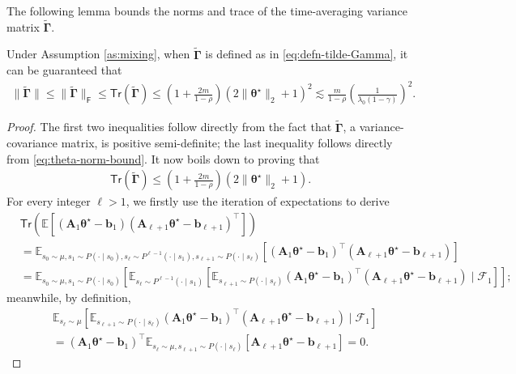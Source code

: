 The following lemma bounds the norms and trace of the time-averaging variance matrix $\tilde{\bm{\Gamma}}$.
\begin{customlemma}\label{lemma:Gamma}
Under Assumption \ref{as:mixing}, when $\tilde{\bm{\Gamma}}$ is defined as in \eqref{eq:defn-tilde-Gamma}, it can be guaranteed that
\begin{align*}
\|\tilde{\bm{\Gamma}}\| \leq \|\tilde{\bm{\Gamma}}\|_{\mathsf{F}} \leq \mathsf{Tr}(\tilde{\bm{\Gamma}}) \leq \left(1+\frac{2m}{1-\rho}\right) (2\|\bm{\theta}^\star\|_2+1)^2 \lesssim \frac{m}{1-\rho}\left(\frac{1}{\lambda_0(1-\gamma)}\right)^2.
\end{align*}
\end{customlemma}
\begin{proof} 
The first two inequalities follow directly from the fact that $\tilde{\bm{\Gamma}}$, a variance-covariance matrix, is positive semi-definite; the last inequality follows directly from \eqref{eq:theta-norm-bound}. It now boils down to proving that
\begin{align*}
\mathsf{Tr}(\tilde{\bm{\Gamma}}) \leq \left(1+\frac{2m}{1-\rho}\right) (2\|\bm{\theta}^\star\|_2+1).
\end{align*}
For every integer $\ell>1$, we firstly use the iteration of expectations to derive
\begin{align*}
&\mathsf{Tr}(\mathbb{E}[(\bm{A}_1 \bm{\theta}^\star - \bm{b}_1)(\bm{A}_{\ell+1} \bm{\theta}^\star - \bm{b}_{\ell+1})^\top]) \\ 
&= \mathbb{E}_{s_0 \sim \mu,s_1 \sim P(\cdot \mid s_0), s_{\ell} \sim P^{\ell-1}(\cdot \mid s_1),s_{\ell+1} \sim P(\cdot \mid s_{\ell})}[(\bm{A}_1 \bm{\theta}^\star - \bm{b}_1)^\top (\bm{A}_{\ell+1} \bm{\theta}^\star - \bm{b}_{\ell+1})] \\ 
&= \mathbb{E}_{s_0 \sim \mu,s_1 \sim P(\cdot \mid s_0)}[\mathbb{E}_{s_\ell \sim P^{\ell-1}(\cdot \mid s_1)}[\mathbb{E}_{s_{\ell+1} \sim P(\cdot \mid s_{\ell})} (\bm{A}_1 \bm{\theta}^\star - \bm{b}_1)^\top (\bm{A}_{\ell+1} \bm{\theta}^\star - \bm{b}_{\ell+1}) \mid\mathscr{F}_1]];
\end{align*}
meanwhile, by definition,
\begin{align*}
&\mathbb{E}_{s_\ell \sim \mu}[\mathbb{E}_{s_{\ell+1} \sim P(\cdot \mid s_{\ell})} (\bm{A}_1 \bm{\theta}^\star - \bm{b}_1)^\top (\bm{A}_{\ell+1} \bm{\theta}^\star - \bm{b}_{\ell+1}) \mid\mathscr{F}_1] \\ 
&=(\bm{A}_1 \bm{\theta}^\star - \bm{b}_1)^\top \mathbb{E}_{s_\ell \sim \mu,s_{\ell+1} \sim P(\cdot \mid s_{\ell})}[\bm{A}_{\ell+1} \bm{\theta}^\star - \bm{b}_{\ell+1}] = 0.

\end{align*}
\end{proof}
